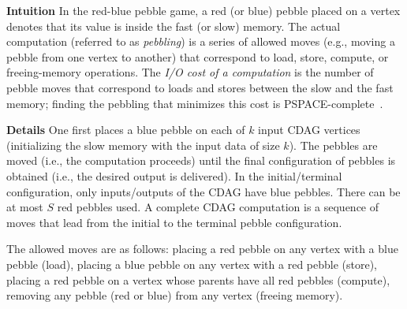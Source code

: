 \documentclass[sigplan,review,anonymous]{acmart}\settopmatter{printfolios=true,printccs=false,printacmref=false}
\newcommand\greg[1]{\textcolor{blue}{[Greg: #1]}}
\newtheorem{defn}{Definition}
\newcommand{\macb}[1]{\textbf{\textsf{#1}}}
\begin{document}
\macb{Intuition}
%
In the red-blue pebble game, a red (or blue) pebble placed on a vertex denotes 
that its value is inside the fast (or slow) memory.
%
%
The actual computation (referred to as
\emph{pebbling}) is a series of allowed moves (e.g., moving a pebble from one
vertex to another) that correspond to load, store, compute, or
freeing-memory operations.
%
The \emph{I/O cost of a computation} is the number of pebble moves that
correspond to loads and stores between the slow and the fast memory; finding 
the pebbling that minimizes
this cost is PSPACE-complete~\cite{redbluecomplete, pebblegameregister}. 

\macb{Details}
%
One first places a blue pebble on each of $k$ input CDAG vertices (initializing 
the
slow memory with the input data of size $k$). The pebbles are moved (i.e., the
computation proceeds) until the final configuration of pebbles is obtained
(i.e., the desired output is delivered). 
%
%
%
In the initial/terminal configuration, only inputs/outputs of the CDAG have
blue pebbles.
%
There can be at most $S$ red pebbles used. A complete CDAG computation is a
sequence of moves that lead from the initial to the terminal pebble
configuration.


The allowed moves are as follows:  placing a red pebble on any vertex
with a blue pebble (load),  placing a blue pebble on any vertex with 
a red
pebble (store),  placing a red pebble on a vertex whose parents have 
all red
pebbles (compute),  removing any pebble (red or blue) from any vertex 
(freeing memory).

\end{document}
